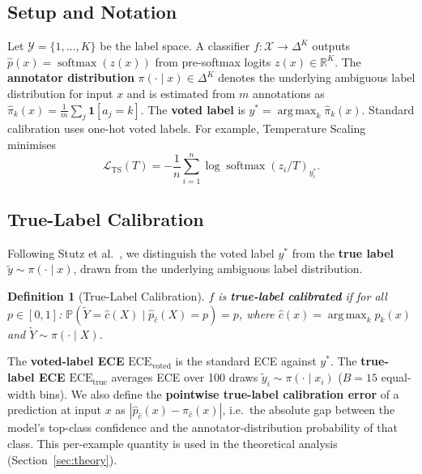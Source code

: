 \documentclass[10pt,journal,compsoc]{IEEEtran}
\newcommand{\X}{\mathcal{X}}
\newcommand{\Y}{\mathcal{Y}}
\newcommand{\phat}{\hat{p}}
\newcommand{\pihat}{\hat{\pi}}
\newcommand{\bP}{\mathbb{P}}
\newcommand{\bR}{\mathbb{R}}
\newcommand{\ECE}{\mathrm{ECE}}
\newcommand{\ECEvoted}{\ECE_{\text{voted}}}
\newcommand{\ECEtrue}{\ECE_{\text{true}}}
\DeclareMathOperator*{\argmax}{arg\,max}
\newtheorem{definition}{Definition}
\begin{document}
\subsection{Setup and Notation}

Let $\Y=\{1,\ldots,K\}$ be the label space.  A classifier $f:\X\to\Delta^K$ outputs $\phat(x)=\operatorname{softmax}(z(x))$ from pre-softmax logits $z(x)\in\bR^K$.  The \textbf{annotator distribution} $\pi(\cdot\mid x)\in\Delta^K$ denotes the underlying ambiguous label distribution for input $x$ and is estimated from $m$ annotations as $\pihat_k(x)=\frac{1}{m}\sum_j\mathbf{1}[a_j=k]$.  The \textbf{voted label} is $y^*=\argmax_k\pihat_k(x)$.  Standard calibration uses one-hot voted labels.  For example, Temperature Scaling \cite{guo2017calibration} minimises
\begin{equation}
  \mathcal{L}_{\text{TS}}(T) = -\frac{1}{n}\sum_{i=1}^n \log \operatorname{softmax}(z_i/T)_{y_i^*}.
  \label{eq:ts-loss}
\end{equation}

\subsection{True-Label Calibration}
\label{sec:true-cal-def}

Following Stutz et al.~\cite{stutz2023conformal}, we distinguish the voted label $y^*$ from the \textbf{true label} $\tilde{y}\sim\pi(\cdot\mid x)$, drawn from the underlying ambiguous label distribution.

\begin{definition}[True-Label Calibration]
\label{def:true-cal}
$f$ is \textbf{true-label calibrated} if for all $p\in[0,1]$:
$\bP(\tilde{Y}=\hat{c}(X)\mid\phat_{\hat{c}}(X)=p)=p$, where $\hat{c}(x)=\argmax_k\phat_k(x)$ and $\tilde{Y}\sim\pi(\cdot\mid X)$.
\end{definition}

The \textbf{voted-label ECE} $\ECEvoted$ is the standard ECE against $y^*$.  The \textbf{true-label ECE} $\ECEtrue$ averages ECE over 100 draws $\tilde{y}_i\sim\pi(\cdot\mid x_i)$ ($B=15$ equal-width bins).  We also define the \textbf{pointwise true-label calibration error} of a prediction at input $x$ as $|\phat_{\hat{c}}(x) - \pi_{\hat{c}}(x)|$, i.e.\ the absolute gap between the model's top-class confidence and the annotator-distribution probability of that class.  This per-example quantity is used in the theoretical analysis (Section~\ref{sec:theory}).

\end{document}
